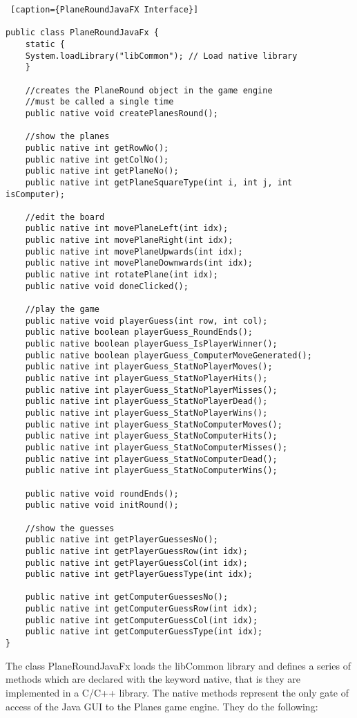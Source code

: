 \begin{lstlisting} [caption={PlaneRoundJavaFX Interface}]

public class PlaneRoundJavaFx {
	static {
	System.loadLibrary("libCommon"); // Load native library 
	}
	
	//creates the PlaneRound object in the game engine
	//must be called a single time	
	public native void createPlanesRound(); 
	
	//show the planes
	public native int getRowNo();
	public native int getColNo();
	public native int getPlaneNo();
	public native int getPlaneSquareType(int i, int j, int isComputer);
	
	//edit the board
	public native int movePlaneLeft(int idx);
	public native int movePlaneRight(int idx);
	public native int movePlaneUpwards(int idx);
	public native int movePlaneDownwards(int idx);
	public native int rotatePlane(int idx);
	public native void doneClicked();
	
	//play the game
	public native void playerGuess(int row, int col);
	public native boolean playerGuess_RoundEnds();
	public native boolean playerGuess_IsPlayerWinner();
	public native boolean playerGuess_ComputerMoveGenerated();
	public native int playerGuess_StatNoPlayerMoves();
	public native int playerGuess_StatNoPlayerHits();
	public native int playerGuess_StatNoPlayerMisses();
	public native int playerGuess_StatNoPlayerDead();
	public native int playerGuess_StatNoPlayerWins();
	public native int playerGuess_StatNoComputerMoves();
	public native int playerGuess_StatNoComputerHits();
	public native int playerGuess_StatNoComputerMisses();
	public native int playerGuess_StatNoComputerDead();
	public native int playerGuess_StatNoComputerWins();
	
	public native void roundEnds();
	public native void initRound();
	
	//show the guesses
	public native int getPlayerGuessesNo();
	public native int getPlayerGuessRow(int idx);
	public native int getPlayerGuessCol(int idx);
	public native int getPlayerGuessType(int idx);
	
	public native int getComputerGuessesNo();
	public native int getComputerGuessRow(int idx);
	public native int getComputerGuessCol(int idx);
	public native int getComputerGuessType(int idx);	
}

\end{lstlisting}

The class PlaneRoundJavaFx loads the libCommon library and defines a series of methods which are declared with the keyword native, that is they are implemented in a C/C++ library. The native methods represent the only gate of access of the Java GUI to the Planes game engine. They do the following:


